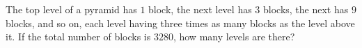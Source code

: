 The top level of a pyramid has $1$ block, the next level has $3$ blocks, the next has $9$ blocks, and so on, each level having three times as many blocks as the level above it. If the total number of blocks is $3280$, how many levels are there?
